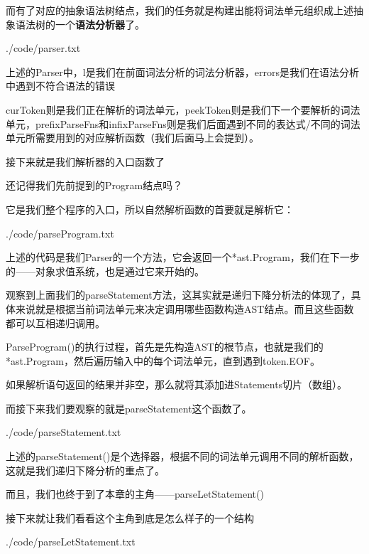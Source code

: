 \documentclass{beamer}
\begin{document}
	\begin{frame}
		而有了对应的抽象语法树结点，我们的任务就是构建出能将词法单元组织成上述抽象语法树的一个\textbf{语法分析器}了。
		
		
		{./code/parser.txt}
	\end{frame}
	\begin{frame}
		上述的Parser中，l是我们在前面词法分析的词法分析器，errors是我们在语法分析中遇到不符合语法的错误
		
		curToken则是我们正在解析的词法单元，peekToken则是我们下一个要解析的词法单元，prefixParseFns和infixParseFns则是我们后面遇到不同的表达式/不同的词法单元所需要用到的对应解析函数（我们后面马上会提到）。
		
		接下来就是我们解析器的入口函数了
		
	\end{frame}
	\begin{frame}
		还记得我们先前提到的Program结点吗？
		
		它是我们整个程序的入口，所以自然解析函数的首要就是解析它：
		
		
		{./code/parseProgram.txt}
	\end{frame}
	\begin{frame}
		上述的代码是我们Parser的一个方法，它会返回一个*ast.Program，我们在下一步的——对象求值系统，也是通过它来开始的。
		
		观察到上面我们的parseStatement方法，这其实就是递归下降分析法的体现了，具体来说就是根据当前词法单元来决定调用哪些函数构造AST结点。而且这些函数都可以互相递归调用。
		
		ParseProgram()的执行过程，首先是先构造AST的根节点，也就是我们的*ast.Program，然后遍历输入中的每个词法单元，直到遇到token.EOF。
		
		如果解析语句返回的结果并非空，那么就将其添加进Statements切片（数组）。
		
		而接下来我们要观察的就是parseStatement这个函数了。
	\end{frame}
	\begin{frame}
		
		{./code/parseStatement.txt}
		
		上述的parseStatement()是个选择器，根据不同的词法单元调用不同的解析函数，这就是我们递归下降分析的重点了。
		
		而且，我们也终于到了本章的主角——parseLetStatement()
	\end{frame}
	\begin{frame}
		接下来就让我们看看这个主角到底是怎么样子的一个结构
		
		
		{./code/parseLetStatement.txt}
	\end{frame}
\end{document}
